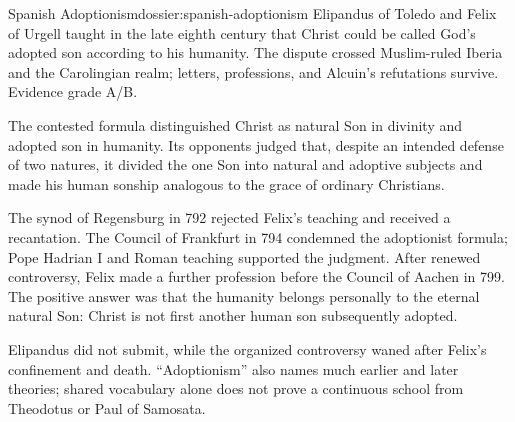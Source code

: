 \begin{heresydossier}{Spanish Adoptionism}{dossier:spanish-adoptionism}
\objectfield Elipandus of Toledo and Felix of Urgell taught in the late eighth century that Christ could be called God's adopted son according to his humanity. The dispute crossed Muslim-ruled Iberia and the Carolingian realm; letters, professions, and Alcuin's refutations survive. Evidence grade A/B.

\propositionfield The contested formula distinguished Christ as natural Son in divinity and adopted son in humanity. Its opponents judged that, despite an intended defense of two natures, it divided the one Son into natural and adoptive subjects and made his human sonship analogous to the grace of ordinary Christians.

\responsefield The synod of Regensburg in 792 rejected Felix's teaching and received a recantation. The Council of Frankfurt in 794 condemned the adoptionist formula; Pope Hadrian I and Roman teaching supported the judgment. After renewed controversy, Felix made a further profession before the Council of Aachen in 799. The positive answer was that the humanity belongs personally to the eternal natural Son: Christ is not first another human son subsequently adopted.

\aftermathfield Elipandus did not submit, while the organized controversy waned after Felix's confinement and death. ``Adoptionism'' also names much earlier and later theories; shared vocabulary alone does not prove a continuous school from Theodotus or Paul of Samosata.
\end{heresydossier}

